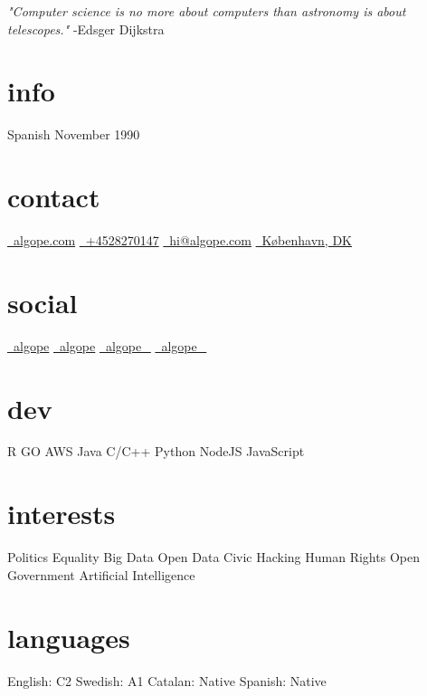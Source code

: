 \documentclass[]{cv}
\begin{document}
       {\emph{"Computer science is no more about computers than astronomy is about telescopes."} -Edsger Dijkstra}


\begin{aside}
	\section{info}
	Spanish
	November 1990
	~~~
    \section{contact}
        \href{https://algope.com}{\faGlobe\ algope.com}
        \href{https://t.me/algope}{\faPhone\ +4528270147}
        \href{mailto:hi@algope.com}{\faEnvelope\ hi@algope.com}
        \href{https://goo.gl/maps/pjW26KgQ3oeQMkN19}{\faStreetView\ København, DK}
        ~~~
    \section{social}
        \href{https://www.linkedin.com/in/algope}{\faLinkedin\ algope} 
        \href{http://github.com/algope}{\faGithub\ algope}
        \href{http://twitter.com/algope_}{\faTwitter\ algope\_}
        \href{https://www.instagram.com/algope_}{\faInstagram\ algope\_}
        ~~~
    \section{dev}
        R
        GO
        AWS
        Java
        C/C++
        Python
        NodeJS
        JavaScript
        ~~~
    \section{interests}
        Politics
        Equality
        Big Data
        Open Data
        Civic Hacking
        Human Rights
        Open Government
        Artificial Intelligence
        ~~~
     \section{languages}
        English: C2
        Swedish: A1
        Catalan: Native
     	Spanish: Native
      	~~~
\end{aside}
\end{document}
